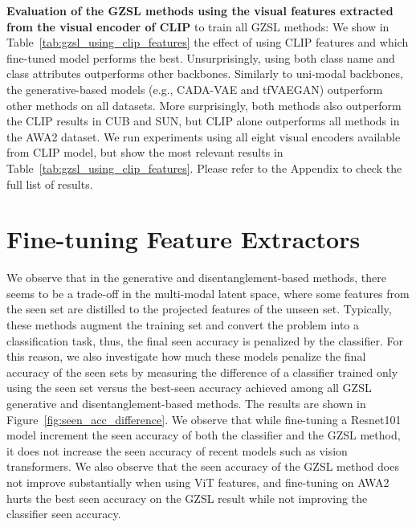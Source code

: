 \textbf{Evaluation of the GZSL methods using the visual features extracted from the visual encoder of CLIP}
to train all GZSL methods: We show in Table~\ref{tab:gzsl_using_clip_features} the effect of using CLIP features and which fine-tuned model performs the best. Unsurprisingly, using both class name and class attributes outperforms other backbones. Similarly to uni-modal backbones, the generative-based models (e.g., CADA-VAE and tfVAEGAN) outperform other methods on all datasets. More surprisingly, both methods also outperform the CLIP results in CUB and SUN, but CLIP alone outperforms all methods in the AWA2 dataset. 
We run experiments using all eight visual encoders available from CLIP model, but show the most relevant results in Table~\ref{tab:gzsl_using_clip_features}. Please refer to the Appendix to check the full list of results.




\section{Fine-tuning Feature Extractors}


 
We observe that in the generative and disentanglement-based methods, there seems to be a trade-off in the multi-modal latent space, where some features from the seen set are distilled to the projected features of the unseen set. Typically, these methods augment the training set and convert the problem into a classification task, thus, the final seen accuracy is penalized by the classifier. 
For this reason, we also investigate how much these models penalize the final accuracy of the seen sets by measuring the difference of a classifier trained only using the seen set versus the best-seen accuracy achieved among all GZSL generative and disentanglement-based methods. 
The results are shown in Figure~\ref{fig:seen_acc_difference}. 
We observe that while fine-tuning a Resnet101 model increment the seen accuracy of both the classifier and the GZSL method, it does not increase the seen accuracy of recent models such as vision transformers. 
We also observe that the seen accuracy of the GZSL method does not improve substantially when using ViT features, 
and fine-tuning on AWA2 hurts the best seen accuracy on the GZSL result while not improving the classifier seen accuracy. 



